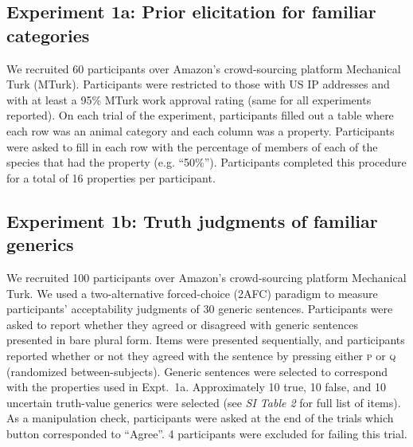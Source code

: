 \documentclass{pnastwo}
\begin{document}
\begin{article}
\begin{materials}
\subsection{Experiment 1a: Prior elicitation for familiar categories}
We recruited 60 participants over Amazon's crowd-sourcing platform Mechanical Turk (MTurk).  
Participants were restricted to those with US IP addresses and with at least a 95\% MTurk work approval rating (same for all experiments reported). 
On each trial of the experiment, participants filled out a table where each row was an animal category and each column was a property. 
Participants were asked to fill in each row with the percentage of members of each of the species that had the property (e.g. ``50\%'').
Participants completed this procedure for a total of 16 properties per participant.

\subsection{Experiment 1b: Truth judgments of familiar generics}
We recruited 100 participants over Amazon's crowd-sourcing platform Mechanical Turk.  
We used a two-alternative forced-choice (2AFC) paradigm to measure participants' acceptability judgments of 30 generic sentences. 
Participants were asked to report whether they agreed or disagreed with generic sentences presented in bare plural form. 
Items were presented sequentially, and participants reported whether or not they agreed with the sentence by pressing either \textsc{p} or \textsc{q} (randomized between-subjects). 
Generic sentences were selected to correspond with the properties used in Expt.~1a. 
Approximately 10 true, 10 false, and 10 uncertain truth-value generics were selected (see {\it SI Table 2} for full list of items).
As a manipulation check, participants were asked at the end of the trials which button corresponded to ``Agree''. 
4 participants were excluded for failing this trial.


\end{materials}
\end{article}
\end{document}
